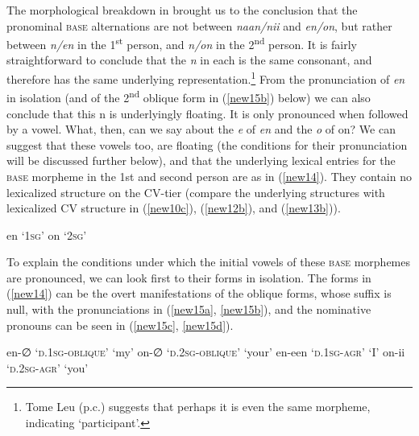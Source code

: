 \documentclass[output=paper]{langscibook}
\begin{document}
The morphological breakdown in  brought us to the conclusion that the pronominal \textsc{base} alternations are not between \textit{naan/nii} and \textit{en/on}, but rather between \textit{n/en} in the 1\textsuperscript{st} person, and \textit{n/on} in the 2\textsuperscript{nd} person. It is fairly straightforward to conclude that the \textit{n} in each is the same consonant, and therefore has the same underlying representation.\footnote{Tome Leu (p.c.) suggests that perhaps it is even the same morpheme, indicating ‘participant’.}  From the pronunciation of \textit{en} in isolation (and of the 2\textsuperscript{nd} oblique form in (\ref{new15b}) below) we can also conclude that this n is underlyingly floating. It is only pronounced when followed by a vowel. What, then, can we say about the \textit{e} of \textit{en} and the \textit{o} of on? We can suggest that these vowels too, are floating (the conditions for their pronunciation will be discussed further below), and that the underlying lexical entries for the \textsc{base} morpheme in the 1st and second person are as in (\ref{new14}). They contain no lexicalized structure on the CV-tier (compare the underlying structures with lexicalized CV structure in (\ref{new10c}), (\ref{new12b}), and (\ref{new13b})).

\begin{exe}
\ex \label{new14}
\begin{xlist}
\ex \label{new14a}
en	‘1\textsc{sg}’ 
\ex \label{new14b}
on	‘2\textsc{sg}’ 
\end{xlist}
\end{exe}

To explain the conditions under which the initial vowels of these \textsc{base} morphemes are pronounced, we can look first to their forms in isolation. The forms in (\ref{new14}) can be the overt manifestations of the oblique forms, whose suffix is null, with the pronunciations in (\ref{new15a}, \ref{new15b}), and the nominative pronouns can be seen in (\ref{new15c}, \ref{new15d}).

\begin{exe}
\ex \label{new15}
\begin{xlist}
\ex \label{new15a}
en-∅ \tab ‘\textsc{d}.1\textsc{sg-oblique}’	 \tab   [\textsuperscript{y}ẽ]  \tab   	‘my’ 
\ex \label{new15b}
on-∅ \tab ‘\textsc{d}.2\textsc{sg-oblique}’	 \tab   [wõ]  \tab ‘your’ 
\ex \label{new15c}
en-een \tab ‘\textsc{d}.1\textsc{sg-agr}’   \tab [nãã] \tab ‘I’ 
\ex \label{new15d}
on-ii \tab `\textsc{d}.2\textsc{sg-agr}’      \tab [nii]   \tab ‘you’ 
\end{xlist}
\end{exe}
\end{document}
